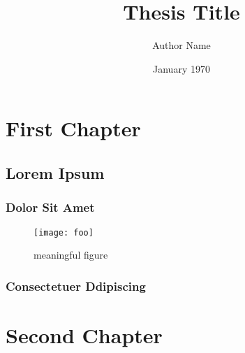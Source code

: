 \documentclass[ %
    final,
    listoffigures,
    listoftables, 
    glossary]{cu-thesis}
\title{Thesis Title}
\author{Author Name}
\date{January 1970}
\begin{document}
    \frontmatter

    \chapter{First Chapter}
    \lipsum[1]

    \section*{Lorem Ipsum}
    \lipsum[3-5]

    \subsection*{Dolor Sit Amet}
    \lipsum[6-9]
    \begin{figure}
        \centering
        \texttt{[image: foo]}
        \caption[]{meaningful figure~\cite{nash51}}
    \end{figure}

    \subsection*{Consectetuer Ddipiscing}
    \lipsum[10-11]

    \chapter{Second Chapter}

    \appendix

    
    
\end{document}
